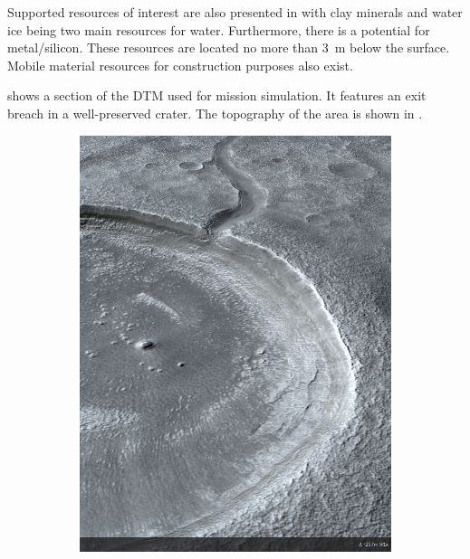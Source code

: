 Supported resources of interest are also presented in  with clay minerals and water ice being two main resources for water. Furthermore, there is a potential for metal/silicon. These resources are located no more than \SI{3}{\meter} below the surface. Mobile material resources for construction purposes also exist.

 shows a section of the \ac{DTM} used for mission simulation. It features an exit breach in a well-preserved crater. The topography of the area is shown in .
\vspace{0.2cm}

\begin{figure}[h]
\captionsetup[subfigure]{justification=centering}
\vspace{-2ex}
	\centering
    \setlength{\subfigureWidth}{0.50\textwidth}
    \setlength{\graphicsHeight}{70mm}
    \hypersetup{hidelinks=true}%
    \begin{subfigure}[t]{\subfigureWidth}
        \centering
        \includegraphics[height=\graphicsHeight]{sections/mars-solar-energy/mission-sites/images/ismenius-cavus-dtm.png}

\end{subfigure}
\end{figure}
